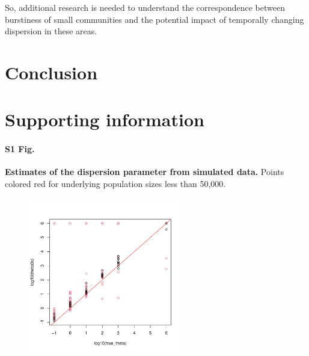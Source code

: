 \documentclass[10pt,letterpaper]{article}
\begin{document}
So, additional research is needed to understand the correspondence between burstiness of small communities and the potential impact of temporally changing dispersion in these areas.

\section*{Conclusion}

\section*{Supporting information}

\paragraph*{S1 Fig.}
\label{S1_Fig}
{\bf Estimates of the dispersion parameter from simulated data.} Points colored red for underlying population sizes less than 50,000.
\begin{figure}[!h]
\includegraphics[width=0.6\textwidth]{thetaest_v_theta.pdf}
\label{S1}
\end{figure}
\end{document}
